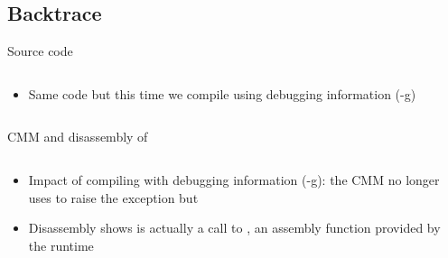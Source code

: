 \subsection{Backtrace}


\begin{frame}{Source code}
  \begin{columns}[c]
    \begin{column}{0.5\textwidth}
      \begin{itemize}
        \item Same code but this time we compile using debugging information (-g)
      \end{itemize}
    \end{column}
    \begin{column}{0.5\textwidth}
    \end{column}
  \end{columns}
\end{frame}

\begin{frame}{CMM and disassembly of }
  \begin{columns}[c]
    \begin{column}{0.5\textwidth}
      \begin{itemize}
        \item<1-> Impact of compiling with debugging information (-g): the CMM no longer uses  to raise the exception but 
        \item<2-> Disassembly shows  is actually a call to , an assembly function provided by the runtime
      \end{itemize}
      \bigskip
    \end{column}
    \begin{column}{0.5\textwidth}
    \end{column}
  \end{columns}
\end{frame}

